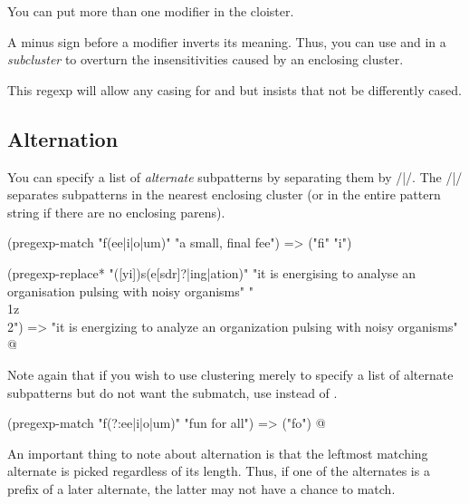 {

You can put more than one modifier in the cloister.


A minus sign before a modifier inverts its meaning.
Thus, you can use  and  in a {\em
subcluster} to overturn the insensitivities caused by an
enclosing cluster.


\n This regexp will allow any casing for 
and  but insists that  not be
differently cased.

\subsection{Alternation}
\label{alternation}

You can specify a list of {\em alternate}
subpatterns by separating them by \p/|/.   The \p/|/
separates subpatterns in the nearest enclosing cluster
(or in the entire pattern string if there are no
enclosing parens).

\q@
(pregexp-match "f(ee|i|o|um)" "a small, final fee")
=> ("fi" "i")

(pregexp-replace* "([yi])s(e[sdr]?|ing|ation)"
   "it is energising to analyse an organisation
   pulsing with noisy organisms"
   "\\1z\\2")
=> "it is energizing to analyze an organization
   pulsing with noisy organisms"
@

Note again that if you wish
to use clustering merely to specify a list of alternate
subpatterns but do not want the submatch, use 
instead of \p{(}.

\q@
(pregexp-match "f(?:ee|i|o|um)" "fun for all")
=> ("fo")
@

An important thing to note about alternation is that
the leftmost matching alternate is picked regardless of
its length.  Thus, if one of the alternates is a prefix
of a later alternate, the latter may not have
a chance to match.

}
